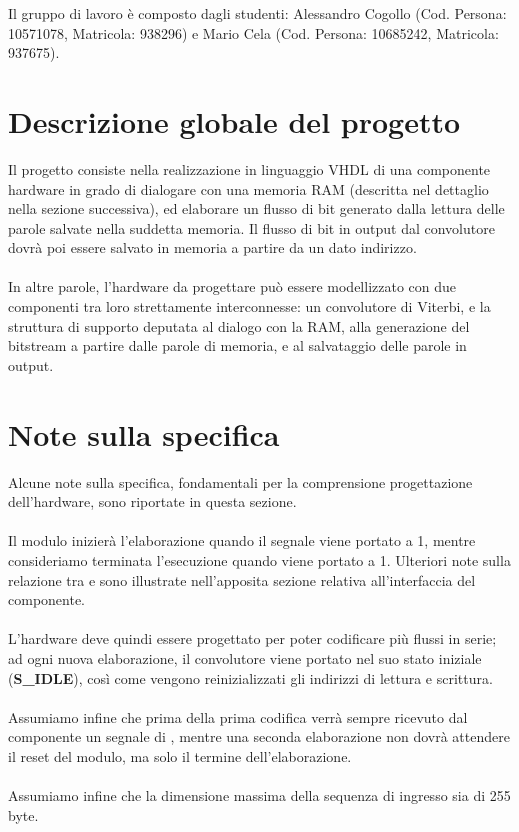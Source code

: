 Il gruppo di lavoro è composto dagli studenti: Alessandro Cogollo (Cod. Persona: 10571078, Matricola: 938296) e Mario Cela (Cod. Persona: 10685242, Matricola: 937675).

\section{Descrizione globale del progetto}

Il progetto consiste nella realizzazione in linguaggio VHDL di una componente hardware in grado di dialogare con una memoria RAM (descritta nel dettaglio nella sezione successiva), ed elaborare un flusso di bit generato dalla lettura delle parole salvate nella suddetta memoria. Il flusso di bit in output dal convolutore dovrà poi essere salvato in memoria a partire da un dato indirizzo.\\\\
In altre parole, l’hardware da progettare può essere modellizzato con due componenti tra loro strettamente interconnesse: un convolutore di Viterbi, e la struttura di supporto deputata al dialogo con la RAM, alla generazione del bitstream a partire dalle parole di memoria, e al salvataggio delle parole in output.


\section{Note sulla specifica}
Alcune note sulla specifica, fondamentali per la comprensione progettazione dell’hardware, sono riportate in questa sezione.
\\\\
Il modulo inizierà l’elaborazione quando il segnale  viene portato a 1, mentre consideriamo terminata l’esecuzione quando  viene portato a 1. Ulteriori note sulla relazione tra  e  sono illustrate nell’apposita sezione relativa all’interfaccia del componente.
\\\\
L’hardware deve quindi essere progettato per poter codificare più flussi in serie; ad ogni nuova elaborazione, il convolutore viene portato nel suo stato iniziale (\textbf{S\_IDLE}), così come vengono reinizializzati gli indirizzi di lettura e scrittura.
\\\\
Assumiamo infine che prima della prima codifica verrà sempre ricevuto dal componente un segnale di , mentre una seconda elaborazione non dovrà attendere il reset del modulo, ma solo il termine dell’elaborazione.
\\\\
Assumiamo infine che la dimensione massima della sequenza di ingresso sia di 255 byte.


